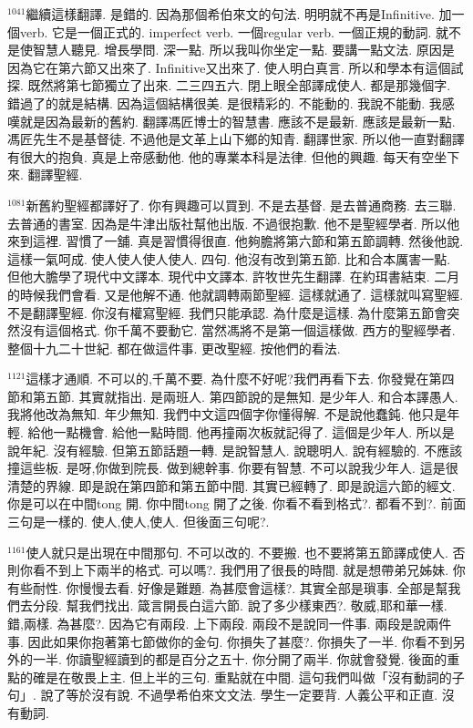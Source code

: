 \documentclass{book}
\begin{document}
$^{1041}$繼續這樣翻譯.
是錯的.
因為那個希伯來文的句法.
明明就不再是Infinitive.
加一個verb.
它是一個正式的.
imperfect verb.
一個regular verb.
一個正規的動詞.
就不是使智慧人聽見.
增長學問.
深一點.
所以我叫你坐定一點.
要講一點文法.
原因是因為它在第六節又出來了.
Infinitive又出來了.
使人明白真言.
所以和學本有這個試探.
既然將第七節獨立了出來.
二三四五六.
閉上眼全部譯成使人.
都是那幾個字.
錯過了的就是結構.
因為這個結構很美.
是很精彩的.
不能動的.
我說不能動.
我感嘆就是因為最新的舊約.
翻譯馮匠博士的智慧書.
應該不是最新.
應該是最新一點.
馮匠先生不是基督徒.
不過他是文革上山下鄉的知青.
翻譯世家.
所以他一直對翻譯有很大的抱負.
真是上帝感動他.
他的專業本科是法律.
但他的興趣.
每天有空坐下來.
翻譯聖經.

$^{1081}$新舊約聖經都譯好了.
你有興趣可以買到.
不是去基督.
是去普通商務.
去三聯.
去普通的書室.
因為是牛津出版社幫他出版.
不過很抱歉.
他不是聖經學者.
所以他來到這裡.
習慣了一舖.
真是習慣得很直.
他夠膽將第六節和第五節調轉.
然後他說.
這樣一氣呵成.
使人使人使人使人.
四句.
他沒有改到第五節.
比和合本厲害一點.
但他大膽學了現代中文譯本.
現代中文譯本.
許牧世先生翻譯.
在約珥書結束.
二月的時候我們會看.
又是他解不通.
他就調轉兩節聖經.
這樣就通了.
這樣就叫寫聖經.
不是翻譯聖經.
你沒有權寫聖經.
我們只能承認.
為什麼是這樣.
為什麼第五節會突然沒有這個格式.
你千萬不要動它.
當然馮將不是第一個這樣做.
西方的聖經學者.
整個十九二十世紀.
都在做這件事.
更改聖經.
按他們的看法.

$^{1121}$這樣才通順.
不可以的,千萬不要.
為什麼不好呢?我們再看下去.
你發覺在第四節和第五節.
其實就指出.
是兩班人.
第四節說的是無知.
是少年人.
和合本譯愚人.
我將他改為無知.
年少無知.
我們中文這四個字你懂得解.
不是說他蠢鈍.
他只是年輕.
給他一點機會.
給他一點時間.
他再撞兩次板就記得了.
這個是少年人.
所以是說年紀.
沒有經驗.
但第五節話題一轉.
是說智慧人.
說聰明人.
說有經驗的.
不應該撞這些板.
是呀,你做到院長.
做到總幹事.
你要有智慧.
不可以說我少年人.
這是很清楚的界線.
即是說在第四節和第五節中間.
其實已經轉了.
即是說這六節的經文.
你是可以在中間tong 開.
你中間tong 開了之後.
你看不看到格式?.
都看不到?.
前面三句是一樣的.
使人,使人,使人.
但後面三句呢?.

$^{1161}$使人就只是出現在中間那句.
不可以改的.
不要搬.
也不要將第五節譯成使人.
否則你看不到上下兩半的格式.
可以嗎?.
我們用了很長的時間.
就是想帶弟兄姊妹.
你有些耐性.
你慢慢去看.
好像是難題.
為甚麼會這樣?.
其實全部是瑣事.
全部是幫我們去分段.
幫我們找出.
箴言開長白這六節.
說了多少樣東西?.
敬威,耶和華一樣.
錯,兩樣.
為甚麼?.
因為它有兩段.
上下兩段.
兩段不是說同一件事.
兩段是說兩件事.
因此如果你抱著第七節做你的金句.
你損失了甚麼?.
你損失了一半.
你看不到另外的一半.
你讀聖經讀到的都是百分之五十.
你分開了兩半.
你就會發覺.
後面的重點的確是在敬畏上主.
但上半的三句.
重點就在中間.
這句我們叫做「沒有動詞的子句」.
說了等於沒有說.
不過學希伯來文文法.
學生一定要背.
人義公平和正直.
沒有動詞.
\end{document}
